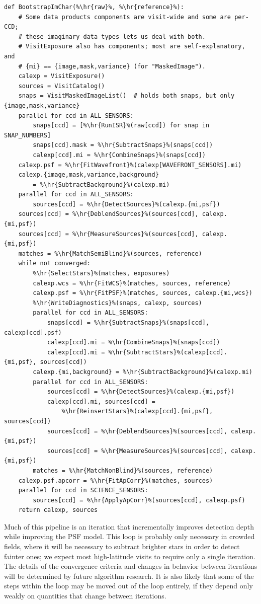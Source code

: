 \begin{lstlisting}
def BootstrapImChar(%\hr{raw}%, %\hr{reference}%):
    # Some data products components are visit-wide and some are per-CCD;
    # these imaginary data types lets us deal with both.
    # VisitExposure also has components; most are self-explanatory, and
    # {mi} == {image,mask,variance} (for "MaskedImage").
    calexp = VisitExposure()
    sources = VisitCatalog()
    snaps = VisitMaskedImageList()  # holds both snaps, but only {image,mask,variance}
    parallel for ccd in ALL_SENSORS:
        snaps[ccd] = [%\hr{RunISR}%(raw[ccd]) for snap in SNAP_NUMBERS]
        snaps[ccd].mask = %\hr{SubtractSnaps}%(snaps[ccd])
        calexp[ccd].mi = %\hr{CombineSnaps}%(snaps[ccd])
    calexp.psf = %\hr{FitWavefront}%(calexp[WAVEFRONT_SENSORS].mi)
    calexp.{image,mask,variance,background}
        = %\hr{SubtractBackground}%(calexp.mi)
    parallel for ccd in ALL_SENSORS:
        sources[ccd] = %\hr{DetectSources}%(calexp.{mi,psf})
    sources[ccd] = %\hr{DeblendSources}%(sources[ccd], calexp.{mi,psf})
    sources[ccd] = %\hr{MeasureSources}%(sources[ccd], calexp.{mi,psf})
    matches = %\hr{MatchSemiBlind}%(sources, reference)
    while not converged:
        %\hr{SelectStars}%(matches, exposures)
        calexp.wcs = %\hr{FitWCS}%(matches, sources, reference)
        calexp.psf = %\hr{FitPSF}%(matches, sources, calexp.{mi,wcs})
        %\hr{WriteDiagnostics}%(snaps, calexp, sources)
        parallel for ccd in ALL_SENSORS:
            snaps[ccd] = %\hr{SubtractSnaps}%(snaps[ccd], calexp[ccd].psf)
            calexp[ccd].mi = %\hr{CombineSnaps}%(snaps[ccd])
            calexp[ccd].mi = %\hr{SubtractStars}%(calexp[ccd].{mi,psf}, sources[ccd])
        calexp.{mi,background} = %\hr{SubtractBackground}%(calexp.mi)
        parallel for ccd in ALL_SENSORS:
            sources[ccd] = %\hr{DetectSources}%(calexp.{mi,psf})
            calexp[ccd].mi, sources[ccd] =
                %\hr{ReinsertStars}%(calexp[ccd].{mi,psf}, sources[ccd])
            sources[ccd] = %\hr{DeblendSources}%(sources[ccd], calexp.{mi,psf})
            sources[ccd] = %\hr{MeasureSources}%(sources[ccd], calexp.{mi,psf})
        matches = %\hr{MatchNonBlind}%(sources, reference)
    calexp.psf.apcorr = %\hr{FitApCorr}%(matches, sources)
    parallel for ccd in SCIENCE_SENSORS:
        sources[ccd] = %\hr{ApplyApCorr}%(sources[ccd], calexp.psf)
    return calexp, sources
\end{lstlisting}

Much of this pipeline is an iteration that incrementally improves detection depth while improving the PSF model.  This loop is probably only necessary in crowded fields, where it will be necessary to subtract brighter stars in order to detect fainter ones; we expect most high-latitude visits to require only a single iteration.  The details of the convergence criteria and changes in behavior between iterations will be determined by future algorithm research.  It is also likely that some of the steps within the loop may be moved out of the loop entirely, if they depend only weakly on quantities that change between iterations.

